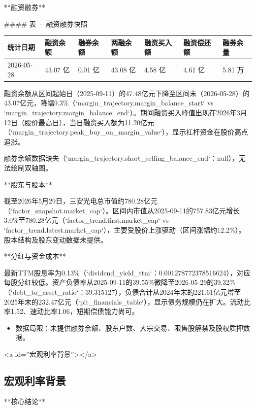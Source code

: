 \documentclass[12pt,a4paper]{article}
\begin{document}
**融资融券**

\#\#\#\# 表 · 融资融券快照

\begin{table}[htbp]
\centering
\begin{tabular}{lllllll}
\toprule
统计日期 & 融资余额 & 融券余额 & 两融余额 & 融资买入额 & 融资偿还额 & 融券余量 \\
\midrule
2026-05-28 & 43.07 亿 & 0.01 亿 & 43.08 亿 & 4.58 亿 & 4.61 亿 & 5.81 万 \\
\bottomrule
\end{tabular}
\end{table}


融资余额从区间起始日（2025-09-11）的47.48亿元下降至区间末（2026-05-28）的43.07亿元，降幅9.3\%（`margin\_trajectory.margin\_balance\_start` vs `margin\_trajectory.margin\_balance\_end`）。期间融资买入峰值出现在2026年3月12日（股价最高日），当日融资买入额为11.20亿元（`margin\_trajectory.peak\_buy\_on\_margin\_value`），显示杠杆资金在股价高点追涨。

融券余额数据缺失（`margin\_trajectory.short\_selling\_balance\_end`：null），无法绘制双轴图。

**股东与股本**

截至2026年5月29日，三安光电总市值约780.28亿元（`factor\_snapshot.market\_cap`）。区间内市值从2025-09-11的757.83亿元增长3.0\%至780.28亿元（`factor\_trend.first.market\_cap` vs `factor\_trend.latest.market\_cap`），主要受股价上涨驱动（区间涨幅约12.2\%）。股本结构及股东变动数据未提供。

**分红与资金成本**

最新TTM股息率为0.13\%（`dividend\_yield\_ttm`：0.001278772378516624），对应每股分红较低。资产负债率从2025-09-11的39.55\%微降至2026-05-29的39.32\%（`debt\_to\_asset\_ratio`：39.315127），负债合计从2024年末的221.61亿元增至2025年末的232.47亿元（`pit\_financials\_table`），显示债务规模仍在扩大。流动比率1.52、速动比率1.06，短期偿债能力尚可。

\begin{itemize}
\item 数据局限：未提供融券余额、股东户数、大宗交易、限售股解禁及股权质押数据。
\end{itemize}

<a id=''宏观利率背景''></a>

\subsection{ 宏观利率背景}

**核心结论**
\end{document}

